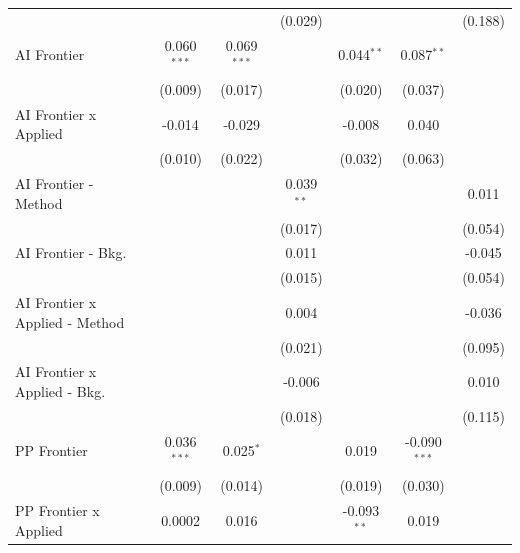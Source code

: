 \begin{tabular}{lcccccc}
                                  &               &               & (0.029)       &               &                & (0.188)\\   
   AI Frontier                    & 0.060$^{***}$ & 0.069$^{***}$ &               & 0.044$^{**}$  & 0.087$^{**}$   &   \\   
                                  & (0.009)       & (0.017)       &               & (0.020)       & (0.037)        &   \\   
   AI Frontier x Applied          & -0.014        & -0.029        &               & -0.008        & 0.040          &   \\   
                                  & (0.010)       & (0.022)       &               & (0.032)       & (0.063)        &   \\   
   AI Frontier - Method           &               &               & 0.039$^{**}$  &               &                & 0.011\\   
                                  &               &               & (0.017)       &               &                & (0.054)\\   
   AI Frontier - Bkg.             &               &               & 0.011         &               &                & -0.045\\   
                                  &               &               & (0.015)       &               &                & (0.054)\\   
   AI Frontier x Applied - Method &               &               & 0.004         &               &                & -0.036\\   
                                  &               &               & (0.021)       &               &                & (0.095)\\   
   AI Frontier x Applied - Bkg.   &               &               & -0.006        &               &                & 0.010\\   
                                  &               &               & (0.018)       &               &                & (0.115)\\   
   PP Frontier                    & 0.036$^{***}$ & 0.025$^{*}$   &               & 0.019         & -0.090$^{***}$ &   \\   
                                  & (0.009)       & (0.014)       &               & (0.019)       & (0.030)        &   \\   
   PP Frontier x Applied          & 0.0002        & 0.016         &               & -0.093$^{**}$ & 0.019          &   \\   

\end{tabular}

